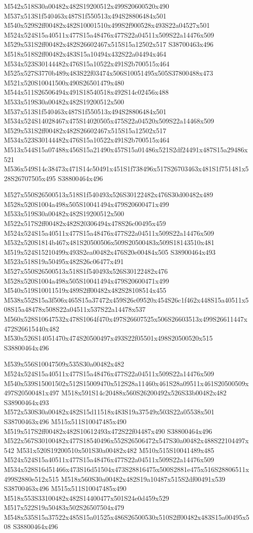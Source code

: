 \documentclass{article}
\begin{document}
\begin{multicols}{2}
M542x518S30a00482x482S19200512x499S20600520x490 M537x513S1f540463x487S1f550513x494S28806484x501 M540x529S2ff00482x482S10001510x499S2f900528x493S22a04527x501 M524x524S15a40511x477S15a48476x477S22a04511x509S22a14476x509 M529x531S2ff00482x482S26602467x515S15a12502x517 S38700463x496 M518x518S2ff00482x483S15a10494x432S22a04494x464 M534x523S30144482x476S15a10522x491S2b700515x464 M525x527S3770b489x483S22f03474x506S10051495x505S37800488x473 M521x520S10041500x490S26501479x480 M544x511S26506494x491S18540518x492S14c02456x488 M533x519S30a00482x482S19200512x500 M537x513S1f540463x487S1f550513x494S28806484x501 M534x524S14028467x475S14020505x475S22a04520x509S22a14468x509 M529x531S2ff00482x482S26602467x515S15a12502x517 M534x523S30144482x476S15a10522x491S2b700515x464 M513x544S15a07488x456S15a21490x457S15a01486x521S2df24491x487S15a29486x521 M536x549S14c38473x471S14c50491x451S1f738496x517S26703463x481S1f751481x528S26707505x495 S38800464x496

M527x550S26500513x518S1f540493x526S30122482x476S30d00482x489 M528x520S1004a498x505S10041494x479S20600471x499 M533x519S30a00482x482S19200512x500 M522x517S2ff00482x482S20306494x478S26c00495x459 M524x524S15a40511x477S15a48476x477S22a04511x509S22a14476x509 M532x520S1814b467x481S20500506x509S20500483x509S18143510x481 M519x524S15210499x493S2ea00482x476S20e00484x505 S38900464x493 M523x518S19a50495x482S26c06477x491 M527x550S26500513x518S1f540493x526S30122482x476 M528x520S1004a498x505S10041494x479S20600471x499 M540x519S10011519x489S2ff00482x482S28108514x455 M538x552S15a3f506x465S15a37472x459S26c09520x454S26c1f462x448S15a40511x508S15a48478x508S22a04511x537S22a14478x537 M560x528S10647532x478S1064f470x497S26607525x506S26603513x499S26611447x472S26615440x482 M530x526S14051470x474S20500497x493S22f05501x498S20500520x515 S38800464x496

M539x556S10047509x535S30a00482x482 M524x524S15a40511x477S15a48476x477S22a04511x509S22a14476x509 M540x539S15001502x512S15009470x512S28a11460x461S28a09511x461S20500509x497S20500481x497 M518x591S14c20488x560S26200492x526S33b00482x482 S38900464x493 M572x530S30a00482x482S15d11518x483S19a37549x503S22a05538x501 S38700463x496 M515x511S10047485x490 M519x517S2ff00482x482S10612493x472S22f04487x490 S38800464x496 M522x567S30100482x477S18540496x552S26506472x547S30a00482x488S22104497x542 M531x520S19200510x501S30a00482x482 M510x515S10041489x485 M524x524S15a40511x477S15a48476x477S22a04511x509S22a14476x509 M534x528S16d51466x473S16d51504x473S28816475x500S2881e475x516S28806511x499S2880e512x515 M518x560S30a00482x482S19a10487x515S2df00491x539 S38700463x496 M515x511S10047485x490 M518x553S33100482x482S14400477x501S24e0d459x529 M517x522S19a50483x502S26507504x479 M548x535S15a37522x485S15a01525x486S26500530x510S2ff00482x483S15a00495x508 S38800464x496


\end{multicols}
\end{document}
